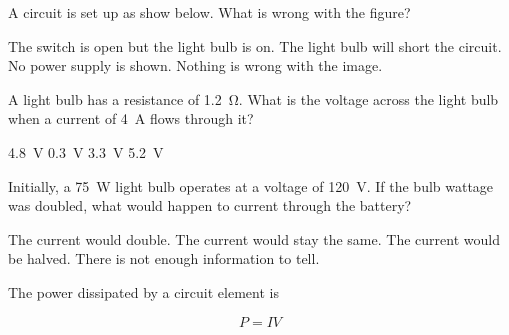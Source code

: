 \documentclass[]{exam}
\begin{document}
\begin{questions}
\ifprintanswers \else \clearpage \fi

\question
A circuit is set up as show below.  What is wrong with the figure?

\begin{center}
\end{center}

\begin{randomizechoices}[keeplast]
    \correctchoice The switch is open but the light bulb is on.
    \choice  The light bulb will short the circuit.
    \choice No power supply is shown.
    \choice Nothing is wrong with the image.
\end{randomizechoices}

\question
A light bulb has a resistance of \SI{1.2}{\ohm}. What is the voltage across the light bulb when a current of \SI{4}{A} flows through it?

\begin{randomizechoices}
    \correctchoice \SI{4.8}{V}
    \choice \SI{0.3}{V}
    \choice \SI{3.3}{V}
    \choice \SI{5.2}{V}
\end{randomizechoices}


\question
Initially, a \SI{75}{W} light bulb operates at a voltage of \SI{120}{V}. If the bulb wattage was doubled, what would happen to current through the battery?

\begin{randomizechoices}[keeplast]
    \correctchoice The current would double.
    \choice The current would stay the same.
    \choice The current would be halved.
    \choice There is not enough information to tell.
\end{randomizechoices}

\begin{solution}
The power dissipated by a circuit element is

\begin{equation*}
    P=IV
\end{equation*}


\end{solution}
\end{questions}
\end{document}
